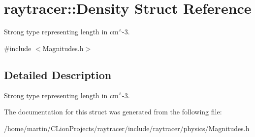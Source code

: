\hypertarget{structraytracer_1_1Density}{}\section{raytracer\+:\+:Density Struct Reference}
\label{structraytracer_1_1Density}


Strong type representing length in cm$^\wedge$-\/3.  




{\ttfamily \#include $<$Magnitudes.\+h$>$}



\subsection{Detailed Description}
Strong type representing length in cm$^\wedge$-\/3. 



The documentation for this struct was generated from the following file\+:\begin{DoxyCompactItemize}
\item 
/home/martin/\+C\+Lion\+Projects/raytracer/include/raytracer/physics/Magnitudes.\+h\end{DoxyCompactItemize}
